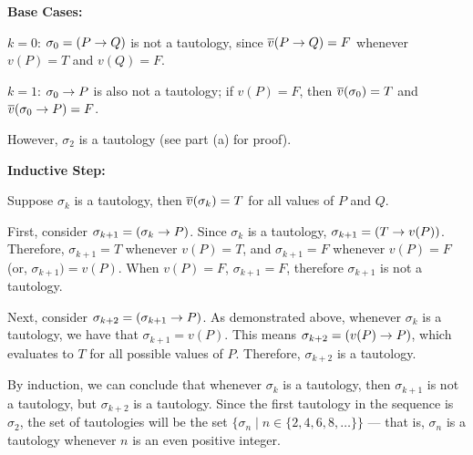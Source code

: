 \begin{problem}
\begin{enumalph}
\begin{Answer}
        \noindent
        \textbf{Base Cases:}
        \begin{enumroman}
          \item $k=0$:
            $\sigma_0 = (P \rightarrow Q)$ is not a tautology, since $\overline{v}(P \rightarrow Q) = F$
              whenever $v(P) = T$ and $v(Q) = F$.
          \item $k=1$: $\sigma_0 \rightarrow P$ is also not a tautology;
            if $v(P) = F$, then $\overline{v}(\sigma_0) = T$ and $\overline{v}(\sigma_0 \rightarrow P) = F$.
          \item However, $\sigma_2$ is a tautology (see part (a) for proof).
        \end{enumroman}
        \textbf{Inductive Step:}
        
          \noindent
          Suppose $\sigma_k$ is a tautology,
          then  $\overline{v}(\sigma_k) = T$ for all values of $P$ and $Q$.
          
          \step
          First, consider $\sigma_{k+1} = (\sigma_k \rightarrow P)$.
          Since $\sigma_k$ is a tautology, $\sigma_{k+1} = (T \rightarrow v(P))$.
          Therefore, $\sigma_{k+1} = T$ whenever $v(P) = T$, and $\sigma_{k+1} = F$
          whenever $v(P) = F$ (or, $\sigma_{k+1}) = v(P)$.
          When $v(P) = F$, $\sigma_{k+1} = F$, therefore $\sigma_{k+1}$ is not a tautology.
          
          \step
          Next, consider $\sigma_{k+2} = (\sigma_{k+1} \rightarrow P)$.
          As demonstrated above, whenever $\sigma_k$ is a tautology,
          we have that $\sigma_{k+1} = v(P)$.
          This means $\sigma_{k+2} = (v(P) \rightarrow P)$, which evaluates to $T$
          for all possible values of $P$.
          Therefore, $\sigma_{k+2}$ is a tautology.

          \step
          By induction, we can conclude that whenever $\sigma_k$ is a tautology,
          then $\sigma_{k+1}$ is not a tautology, but $\sigma_{k+2}$ is a tautology.
          Since the first tautology in the sequence is $\sigma_2$,
          the set of tautologies will be the set $\{ \sigma_n \mid n \in \{2, 4, 6, 8, \ldots \} \}$
          --- that is, $\sigma_n$ is a tautology whenever $n$ is an even positive integer.
      \end{Answer}
  \end{enumalph}
\end{problem}

